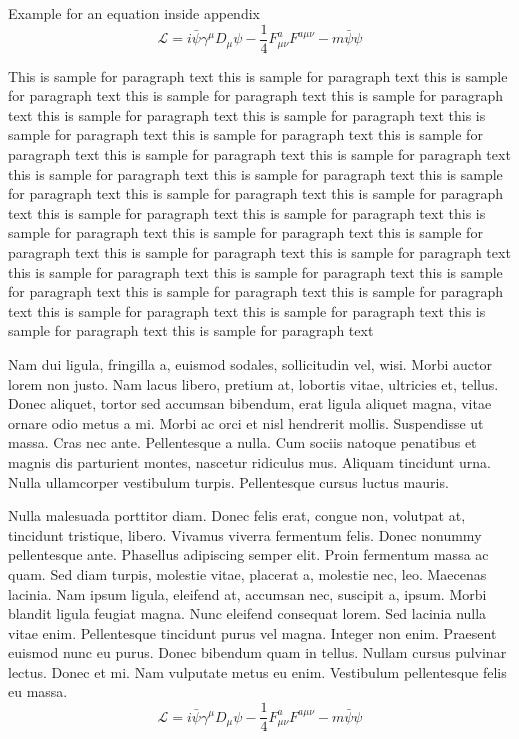 \documentclass[AMA,Times1COL]{WileyNJDv5} %
\begin{document}
Example for an equation inside appendix
\begin{equation}
{\mathcal{L}} = i \bar{\psi} \gamma^\mu D_\mu \psi - \frac{1}{4} F_{\mu\nu}^a F^{a\mu\nu} - m \bar{\psi} \psi\label{eq25}
\end{equation}

%
\vspace*{12pt}
This is sample for paragraph text this is sample for paragraph text  this is sample for paragraph text this is sample for paragraph text this is sample for paragraph text this is sample for paragraph text this is sample for paragraph text this is sample for paragraph text this is sample for paragraph text this is sample for paragraph text this is sample for paragraph text this is sample for paragraph text this is sample for paragraph text this is sample for paragraph text this is sample for paragraph text this is sample for paragraph text this is sample for paragraph text this is sample for paragraph text this is sample for paragraph text this is sample for paragraph text this is sample for paragraph text this is sample for paragraph text this is sample for paragraph text this is sample for paragraph text this is sample for paragraph text this is sample for paragraph text this is sample for paragraph text this is sample for paragraph text this is sample for paragraph text this is sample for paragraph text this is sample for paragraph text this is sample for paragraph text this is sample for paragraph text



Nam dui ligula, fringilla a, euismod sodales, sollicitudin vel, wisi. Morbi auctor lorem non justo. Nam lacus libero,
pretium at, lobortis vitae, ultricies et, tellus. Donec aliquet, tortor sed accumsan bibendum, erat ligula aliquet magna,
vitae ornare odio metus a mi. Morbi ac orci et nisl hendrerit mollis. Suspendisse ut massa. Cras nec ante. Pellentesque
a nulla. Cum sociis natoque penatibus et magnis dis parturient montes, nascetur ridiculus mus. Aliquam tincidunt
urna. Nulla ullamcorper vestibulum turpis. Pellentesque cursus luctus mauris.

Nulla malesuada porttitor diam. Donec felis erat, congue non, volutpat at, tincidunt tristique, libero. Vivamus
viverra fermentum felis. Donec nonummy pellentesque ante. Phasellus adipiscing semper elit. Proin fermentum massa
ac quam. Sed diam turpis, molestie vitae, placerat a, molestie nec, leo. Maecenas lacinia. Nam ipsum ligula, eleifend
at, accumsan nec, suscipit a, ipsum. Morbi blandit ligula feugiat magna. Nunc eleifend consequat lorem. Sed lacinia
nulla vitae enim. Pellentesque tincidunt purus vel magna. Integer non enim. Praesent euismod nunc eu purus. Donec
bibendum quam in tellus. Nullam cursus pulvinar lectus. Donec et mi. Nam vulputate metus eu enim. Vestibulum
pellentesque felis eu massa.
\begin{equation}
\mathcal{L} = i \bar{\psi} \gamma^\mu D_\mu \psi
    - \frac{1}{4} F_{\mu\nu}^a F^{a\mu\nu} - m \bar{\psi} \psi
\label{eq26}
\end{equation}
\end{document}
